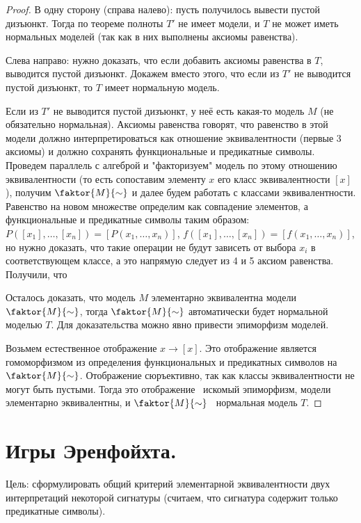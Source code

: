 \documentclass{article}
\begin{document}
\begin{proof}
	В одну сторону (справа налево): пусть получилось вывести пустой дизъюнкт. Тогда по теореме полноты \(T'\) не имеет модели, и \(T\) не может иметь нормальных моделей (так как в них выполнены аксиомы равенства).

	Слева направо: нужно доказать, что если добавить аксиомы равенства в \(T\), выводится пустой дизъюнкт. Докажем вместо этого, что если из \(T'\) не выводится пустой дизъюнкт, то \(T\) имеет нормальную модель.

	Если из \(T'\) не выводится пустой дизъюнкт, у неё есть какая-то модель \(M\) (не обязательно нормальная). Аксиомы равенства говорят, что равенство в этой модели должно интерпретироваться как отношение эквивалентности (первые 3 аксиомы) и должно сохранять функциональные и предикатные символы. Проведем параллель с алгеброй и "факторизуем" модель по этому отношению эквивалентности (то есть сопоставим элементу \(x\) его класс эквивалентности \([x]\)), получим \(\faktor{M}{\sim}\) и далее будем работать с классами эквивалентности. Равенство на новом множестве определим как совпадение элементов, а функциональные и предикатные символы таким образом: \(P([x_1], \dots, [x_n]) = \left[P(x_1, \dots, x_n)\right]\), \(f([x_1], \dots, [x_n]) = \left[f(x_1, \dots, x_n)\right]\), но нужно доказать, что такие операции не будут зависеть от выбора \(x_i\) в соответствующем классе, а это напрямую следует из 4 и 5 аксиом равенства. Получили, что

	Осталось доказать, что модель \(M\) элементарно эквивалентна модели \(\faktor{M}{\sim}\), тогда \(\faktor{M}{\sim}\) автоматически будет нормальной моделью \(T\). Для доказательства можно явно привести эпиморфизм моделей.

	Возьмем естественное отображение \(x \rightarrow [x]\). Это отображение является гомоморфизмом из определения функциональных и предикатных символов на \(\faktor{M}{\sim}\). Отображение сюръективно, так как классы эквивалентности не могут быть пустыми. Тогда это отображение \textemdash\ искомый эпиморфизм, модели элементарно эквивалентны, и \(\faktor{M}{\sim}\) \textemdash\ нормальная модель \(T\).
\end{proof}

\setcounter{section}{25}
\section{Игры Эренфойхта.}

Цель: сформулировать общий критерий
элементарной эквивалентности двух интерпретаций некоторой сигнатуры (считаем, что сигнатура содержит только предикатные символы).
\end{document}
